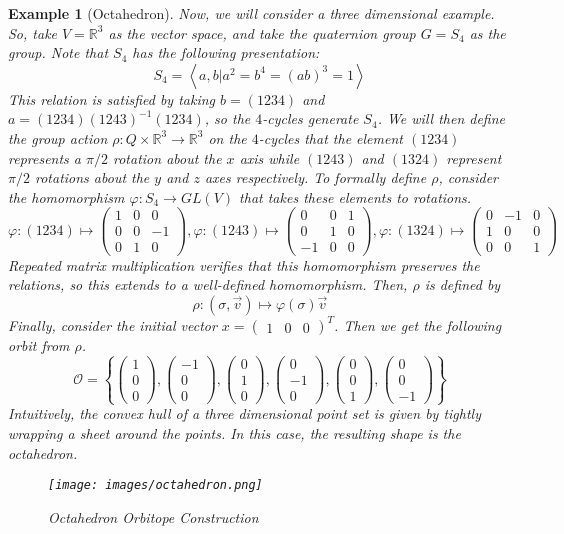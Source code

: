 \documentclass[12]{amsart}
\newtheorem{example}[theorem]{Example}
\newcommand{\orb}[0]{\mathcal{O}}
\newcommand{\gen}[1]{\left<#1\right>}
\newcommand{\set}[1]{ \left\{ #1 \right\} }
\newcommand{\vecxxx}[3]{\begin{pmatrix} #1\\#2\\#3\end{pmatrix}}
\begin{document}
\begin{example}[Octahedron]
	Now, we will consider a three dimensional example. So, take $V = \mathbb{R}^3$ as the vector space, and take the quaternion group $G = S_4$ as the group. Note that $S_4$ has the following presentation:
	\begin{equation*}
		S_4 = \gen{a,b \vert a^2 = b^4 = (ab)^3 = 1}
	\end{equation*}
This relation is satisfied by taking $b = (1234)$ and $a = (1234)(1243)^{-1}(1234)$, so the $4$-cycles generate $S_4$.
We will then define the group action $\rho: Q \times \mathbb{R}^3 \to \mathbb{R}^3$ on the $4$-cycles that the element $(1234)$ represents a $\pi/2$ rotation about the $x$ axis while $(1243)$ and $(1324)$ represent $\pi/2$ rotations about the $y$ and $z$ axes respectively. To formally define $\rho$, consider the homomorphism $\varphi: S_4 \to GL(V)$ that takes these elements to rotations.
	\begin{equation*}
		\varphi: (1234) \mapsto
		\begin{pmatrix}
		1 & 0 & 0\\
		0 & 0 & -1\\
		0 & 1 & 0
		\end{pmatrix},
		\varphi: (1243) \mapsto
		\begin{pmatrix}
		0 & 0 & 1\\
		0 & 1 & 0\\
		-1 & 0 & 0
		\end{pmatrix},
		\varphi: (1324) \mapsto
		\begin{pmatrix}
		0 & -1 & 0\\
		1 & 0 & 0\\
		0 & 0 & 1
		\end{pmatrix}
	\end{equation*}
	Repeated matrix multiplication verifies that this homomorphism preserves the relations, so this extends to a well-defined homomorphism. Then, $\rho$ is defined by
	 \begin{equation*}
	 	\rho: (\sigma, \vec{v}) \mapsto \varphi(\sigma)\vec{v}
	 \end{equation*}
	 Finally, consider the initial vector 
	 $x = \begin{pmatrix} 1 & 0 & 0 \end{pmatrix}^T$. Then we get the following orbit from $\rho$.
	 \begin{equation*}
	 \orb = \set{\vecxxx{1}{0}{0}, \vecxxx{-1}{0}{0}, 
	             \vecxxx{0}{1}{0}, \vecxxx{0}{-1}{0},
	             \vecxxx{0}{0}{1}, \vecxxx{0}{0}{-1}}
	 \end{equation*}
	 Intuitively, the convex hull of a three dimensional point set is given by tightly wrapping a sheet around the points. In this case, the resulting shape is the octahedron. 
	 \begin{figure}[h!]
		\texttt{[image: images/octahedron.png]}
		\caption{Octahedron Orbitope Construction}
		\label{fig:octahedron}
	\end{figure}		
\end{example}
\end{document}

